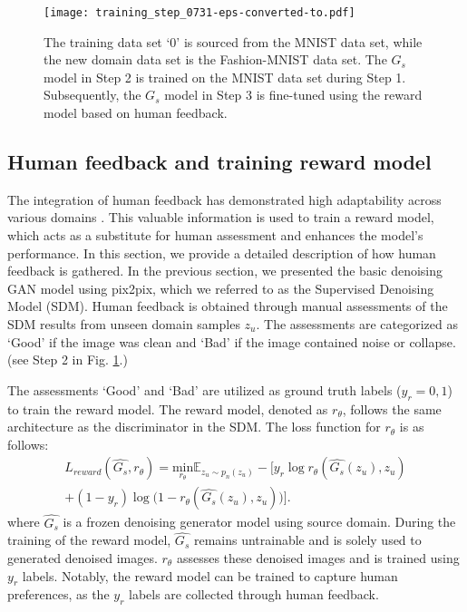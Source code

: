 \documentclass[lettersize,journal]{IEEEtran}
\begin{document}
\begin{figure*}[!t]
\centering
\texttt{[image: training\_step\_0731-eps-converted-to.pdf]}
\caption{The training data set `0' is sourced from the MNIST data set, while the new domain data set is the Fashion-MNIST data set. The $G_s$ model in Step 2 is trained on the MNIST data set during Step 1. Subsequently, the $G_s$ model in Step 3 is fine-tuned using the reward model based on human feedback.}
\label{training_step}
\end{figure*}

\subsection{Human feedback and training reward model}
The integration of human feedback has demonstrated high adaptability across various domains \cite{lee2023aligning,ouyang2022training,stiennon2020learning}. This valuable information is used to train a reward model, which acts as a substitute for human assessment and enhances the model's performance. In this section, we provide a detailed description of how human feedback is gathered. In the previous section, we presented the basic denoising GAN model using pix2pix\cite{isola2017image}, which we referred to as the Supervised Denoising Model (SDM). Human feedback is obtained through manual assessments of the SDM results from unseen domain samples $z_u$. The assessments are categorized as `Good' if the image was clean and `Bad' if the image contained noise or collapse. (see Step 2 in Fig. \ref{training_step}.)

The assessments `Good' and `Bad' are utilized as ground truth labels ($y_r={0,1}$) to train the reward model. The reward model, denoted as $r_\theta$, follows the same architecture as the discriminator in the SDM. The loss function for $r_\theta$ is as follows:
\begin{multline}
\label{reward_loss}
L_{reward}(\hat{G_s}, r_\theta) = \underset {r_\theta} {\text{min}} \mathbb{E}_{z_u\sim p_n(z_u)}-[y_r \log{r_\theta(\hat{G_s}(z_u), z_u)}
\\+(1-y_r)\log{(1-r_\theta(\hat{G_s}(z_u),z_u)})].
\end{multline}
where $\hat{G_s}$ is a frozen denoising generator model using source domain. During the training of the reward model, $\hat{G_s}$ remains untrainable and is solely used to generated denoised images. $r_\theta$ assesses these denoised images and is trained using $y_r$ labels. Notably, the reward model can be trained to capture human preferences, as the $y_r$ labels are collected through human feedback.
\end{document}
